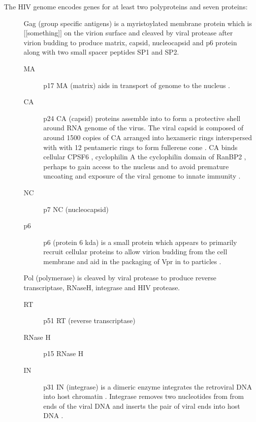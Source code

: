 \documentclass[../sherrill-Mix_thesis.tex]{subfiles}
\begin{document}
	The HIV genome encodes genes for at least two polyproteins and seven proteins:\\ %
	\begin{description}
		\item[\gag{}]
			Gag (group specific antigens) is a myristoylated membrane protein which is [[something]] on the virion surface and cleaved by viral protease after virion budding to produce matrix, capsid, nucleocapsid and p6 protein along with two small spacer peptides SP1 and SP2. 
			\begin{description}
				\item[MA]
					p17 MA (matrix) aids in transport of genome to the nucleus \citep{Heinzinger1994}.
				\item[CA]
						p24 CA (capsid) proteins assemble into to form a protective shell around RNA genome of the virus. The viral capsid is composed of around 1500 copies of CA arranged into hexameric rings interspersed with with 12 pentameric rings to form fullerene cone \citep{Ganser1999,Li2000,Byeon2009,Zhao2013}. CA binds cellular CPSF6 \citep{Lee2010}, cyclophilin A \citep{Thali1994,Gamble1996} the cyclophilin domain of RanBP2 \citep{Schaller2011}, perhaps to gain access to the nucleus \citep{Schaller2011,Ocwieja2011} and to avoid premature uncoating and exposure of the viral genome to innate immunity \citep{Rasaiyaah2013}.
				\item[NC]
					p7 NC (nucleocapsid)
				\item[p6]
					p6 (protein 6 kda) is a small protein which appears to primarily recruit cellular proteins to allow virion budding from the cell membrane \citep{Veronese1987,Goettlinger1991,Strack2003} and aid in the packaging of Vpr in to particles \citep{Paxton1993}.
			\end{description}
		\item[\pol{}]
			Pol (polymerase) is cleaved by viral protease to produce reverse transcriptase, RNaseH, integrase and HIV protease. 
			\begin{description}
				\item[RT]
					p51 RT (reverse transcriptase)
				\item[RNase H]
					p15 RNase H
				\item[IN]
					p31 IN (integrase) is a dimeric enzyme integrates the retroviral DNA into host chromatin \citep{Bushman1990,Engelman1991,Panganiban1984,Maertens2010,Hare2010}. Integrase removes two nucleotides from from \threePrime{} ends of the viral DNA and inserts the pair of viral ends into host DNA \citep{Bushman1991}.

\end{description}
\end{description}
\end{document}
